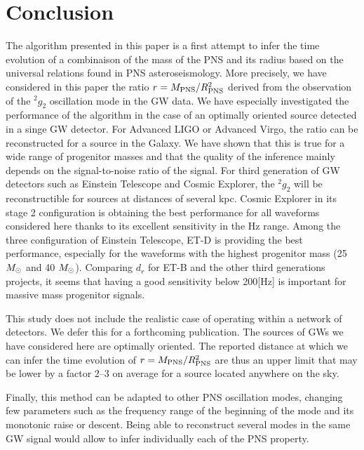\section{Conclusion}
The algorithm presented in this paper is a first attempt to infer the time evolution of a
combinaison of the mass of the PNS and its radius based on the universal relations found
in PNS asteroseismology. More precisely, we have considered in this paper the ratio
$r=M_{\rm PNS}/R_{\rm PNS}^2$ derived from the observation of the $\mbox{}^2g_2$
oscillation mode in the GW data. We have especially investigated the performance of the algorithm
in the case of an optimally oriented source detected in a singe GW detector. For Advanced LIGO
or Advanced Virgo, the ratio can be reconstructed for a source in the Galaxy. We have shown
that this is true for a wide range of progenitor masses and that the quality of the inference
mainly depends on the signal-to-noise ratio of the signal. For third generation of GW detectors such
as Einstein Telescope and Cosmic Explorer, the $\mbox{}^2g_2$ will be reconstructible for sources
at distances of several kpc. Cosmic Explorer in its stage 2 configuration is obtaining the best performance
for all waveforms considered here thanks to its excellent sensitivity in the \unit[100-1000]{Hz} range.
Among the three configuration of Einstein Telescope, ET-D is providing the best performance,
especially for the waveforms with the highest progenitor mass (25 $M_{\odot}$ and 40 $M_{\odot}$). Comparing
$d_r$ for ET-B and the other third generations projects, it seems that having a good sensitivity
below \unit{200}[Hz] is important for massive mass progenitor signals.


This study does not include the realistic case of operating within a network of detectors. We defer this
for a forthcoming publication. The sources of GWs we have considered here are optimally oriented. The
reported distance at which we can infer the time evolution of $r=M_{\rm PNS}/R_{\rm PNS}^2$ are thus an
upper limit that may be lower by a factor 2--3 on average for a source located anywhere on the sky.

Finally, this method can be adapted to other PNS oscillation modes, changing few parameters such as
the frequency range of the beginning of the mode and its monotonic raise or descent. Being able to
reconstruct several modes in the same GW signal would allow to infer individually each of the PNS property.

